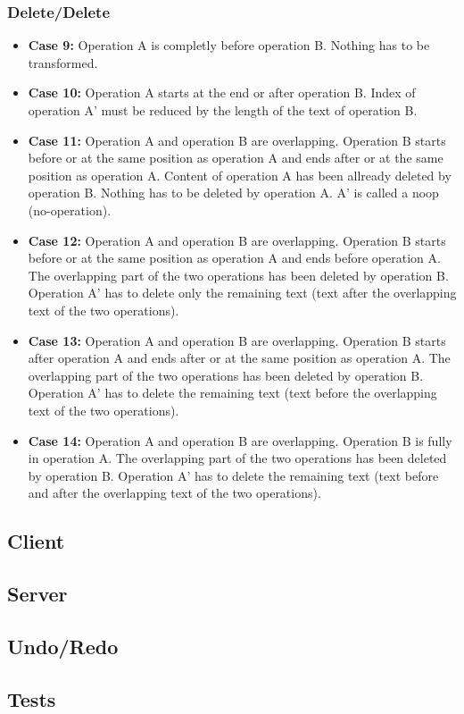 \subsubsection{Delete/Delete}
\begin{itemize}
\item \textbf{Case 9:}
Operation A is completly before operation B. Nothing has to be transformed.
\item \textbf{Case 10:}
Operation A starts at the end or after operation B. Index of operation A' must be reduced by the length of the text of operation B.
\item \textbf{Case 11:}
Operation A and operation B are overlapping. Operation B starts before or at the same position as operation A and ends after or at the same position as operation A. Content of operation A has been allready deleted by operation B. Nothing has to be deleted by operation A. A' is called a noop (no-operation).
\item \textbf{Case 12:}
Operation A and operation B are overlapping. Operation B starts before or at the same position as operation A and ends before operation A. The overlapping part of the two operations has been deleted by operation B. Operation A' has to delete only the remaining text (text after the overlapping text of the two operations).
\item \textbf{Case 13:}
Operation A and operation B are overlapping. Operation B starts after operation A and ends after or at the same position as operation A. The overlapping part of the two operations has been deleted by operation B. Operation A' has to delete the remaining text (text before the overlapping text of the two operations).
\item \textbf{Case 14:}
Operation A and operation B are overlapping. Operation B is fully in operation A. The overlapping part of the two operations has been deleted by operation B. Operation A' has to delete the remaining text (text before and after the overlapping text of the two operations).
\end{itemize}



\subsection{Client}


\subsection{Server}


\subsection{Undo/Redo}


\subsection{Tests}

